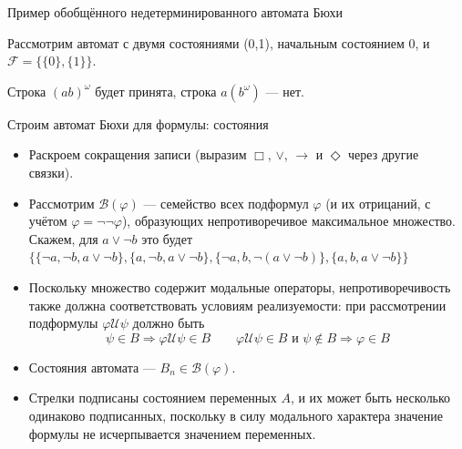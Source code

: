 \documentclass[aspectratio=169,dvipsnames,usenames]{beamer}
\begin{document}
\begin{frame}{Пример обобщённого недетерминированного автомата Бюхи}
\begin{exm}
Рассмотрим автомат с двумя состояниями (0,1), начальным состоянием 0, и $\mathcal{F} = \{\{0\},\{1\}\}$.


Строка $(ab)^\omega$ будет принята, строка $a(b^\omega)$ --- нет.
\end{exm}
\end{frame}

\begin{frame}{Строим автомат Бюхи для формулы: состояния}
\begin{itemize}
\item Раскроем сокращения записи (выразим $\Box$, $\vee$, $\rightarrow$ и $\Diamond$ через другие связки).
\item Рассмотрим $\mathcal{B}(\varphi)$ --- семейство всех подформул $\varphi$ (и их отрицаний,
с учётом $\varphi = \neg\neg\varphi$), 
образующих непротиворечивое максимальное множество. Скажем, для $a\vee\neg b$ это будет
$\{\{\neg a,\neg b,a\vee\neg b\},\{a,\neg b,a \vee\neg b\},
\{\neg a,b,\neg(a\vee\neg b)\},\{a,b,a\vee\neg b\}\}$
\item Поскольку множество содержит модальные операторы, непротиворечивость также должна
соответствовать условиям реализуемости: при рассмотрении подформулы $\varphi\mathcal{U}\psi$ должно быть
$$\psi\in B \Rightarrow \varphi\mathcal{U}\psi \in B\quad\quad
  \varphi\mathcal{U}\psi \in B \text{ и }\psi \notin B \Rightarrow \varphi \in B$$
\item Состояния автомата --- $B_n \in \mathcal{B}(\varphi)$.
\item Стрелки подписаны состоянием переменных $A$, и их может быть несколько одинаково
подписанных, поскольку в силу модального характера значение формулы не исчерпывается 
значением переменных.
\end{itemize}
\end{frame}
\end{document}
